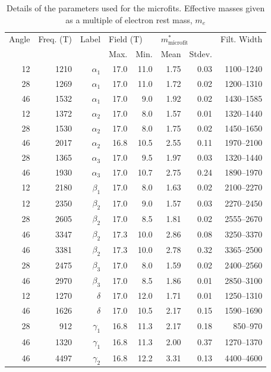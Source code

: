 \begin{table}
    \begin{center}
        \caption{Details of the parameters used for the microfits. Effective masses given as a multiple of electron rest mass, $m_e$}
{\small
        \begin{tabular}[htbp]{rrrrrrrr}
\toprule
Angle	& Freq. (\unit{T})	& Label	 & \multicolumn{2}{l}{Field (\unit[]{T})}  & \multicolumn{2}{l}{$m^*_{\textrm{microfit}}$}  & Filt. Width\\
        &                   &       & Max. & Min. & Mean & Stdev.   &   \\
\midrule
12	& 1210	& $\alpha_1$	& 17.0	& 11.0	& 1.75	& 0.03 &	1100--1240\\
28	& 1269	& $\alpha_1$	& 17.0	& 11.0	& 1.72	& 0.02 &	1200--1310\\
46	& 1532	& $\alpha_1$	& 17.0	& 9.0	& 1.92	& 0.02 &	1430--1585\\
12	& 1372	& $\alpha_2$	& 17.0	& 8.0	& 1.57	& 0.01 &	1320--1440\\
28	& 1530	& $\alpha_2$	& 17.0	& 8.0	& 1.75	& 0.02 &	1450--1650\\
46	& 2017	& $\alpha_2$	& 16.8	& 10.5	& 2.55	& 0.11 &	1970--2100\\
28	& 1365	& $\alpha_3$	& 17.0	& 9.5	& 1.97	& 0.03 &	1320--1440\\
46	& 1930	& $\alpha_3$	& 17.0	& 10.7	& 2.75	& 0.24 &	1890--1970\\
12	& 2180	& $\beta_1$	& 17.0	& 8.0	& 1.63	& 0.02 &	2100--2270\\
12	& 2350	& $\beta_2$	& 17.0	& 9.0	& 1.57	& 0.03 &	2270--2450\\
28	& 2605	& $\beta_2$	& 17.0	& 8.5	& 1.81	& 0.02 &	2555--2670\\
46	& 3347	& $\beta_2$	& 17.3	& 10.0	& 2.86	& 0.08 &	3250--3370\\
46	& 3381	& $\beta_2$	& 17.3	& 10.0	& 2.78	& 0.32 &	3365--2500\\
28	& 2475	& $\beta_3$	& 17.0	& 8.0	& 1.59	& 0.02 &	2400--2560\\
46	& 2970	& $\beta_3$	& 17.0	& 8.5	& 1.86	& 0.01 &	2850--3100\\
12	& 1270	& $\delta$	& 17.0	& 12.0	& 1.71	& 0.01 &	1250--1310\\
46	& 1626	& $\delta$	& 17.0	& 10.5	& 2.17	& 0.15 &	1590--1690\\
28	& 912	& $\gamma_1$	& 16.8	& 11.3	& 2.17	& 0.18 &	850--970  \\
46	& 1320	& $\gamma_1$	& 16.8	& 11.3	& 2.00	& 0.37 &	1270--1370\\
46	& 4497	& $\gamma_2$	& 16.8	& 12.2	& 3.31	& 0.13 &	4400--4600\\
\bottomrule
        \end{tabular}
}
        \label{Table:3:MicroFitResults}
    \end{center}
\end{table}


